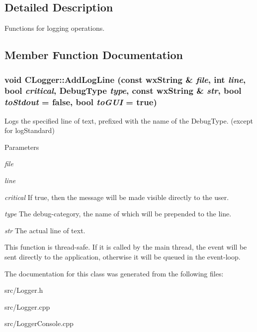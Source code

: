 \subsection{Detailed Description}
Functions for logging operations. 

\subsection{Member Function Documentation}
\subsubsection[{AddLogLine}]{\setlength{\rightskip}{0pt plus 5cm}void CLogger::AddLogLine (const wxString \& {\em file}, \/  int {\em line}, \/  bool {\em critical}, \/  DebugType {\em type}, \/  const wxString \& {\em str}, \/  bool {\em toStdout} = {\ttfamily false}, \/  bool {\em toGUI} = {\ttfamily true})}\label{classCLogger_a4f274d60bb37aaff6c773bf1256ff496}


Logs the specified line of text, prefixed with the name of the DebugType. (except for logStandard)


\begin{DoxyParams}{Parameters}
\item[{\em file}]\item[{\em line}]\item[{\em critical}]If true, then the message will be made visible directly to the user. \item[{\em type}]The debug-\/category, the name of which will be prepended to the line. \item[{\em str}]The actual line of text.\end{DoxyParams}
This function is thread-\/safe. If it is called by the main thread, the event will be sent directly to the application, otherwise it will be queued in the event-\/loop. 

The documentation for this class was generated from the following files:\begin{DoxyCompactItemize}
\item 
src/Logger.h\item 
src/Logger.cpp\item 
src/LoggerConsole.cpp\end{DoxyCompactItemize}
